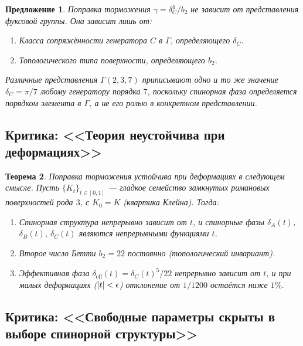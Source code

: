 \documentclass[12pt,a4paper]{article}
\newtheorem{theorem}{Теорема}[section]
\newtheorem{proposition}[theorem]{Предложение}
\theoremstyle{definition}
\theoremstyle{remark}
\DeclarePairedDelimiter\abs{\lvert}{\rvert}
\begin{document}
\begin{proposition}
Поправка торможения $\gamma = \delta_C^4/b_2$ не зависит от представления фуксовой группы. Она зависит лишь от:
\begin{enumerate}[label=(\roman*)]
\item Класса сопряжённости генератора $C$ в $\Gamma$, определяющего $\delta_C$.
\item Топологического типа поверхности, определяющего $b_2$.
\end{enumerate}
Различные представления $\Gamma(2,3,7)$ приписывают одно и то же значение $\delta_C = \pi/7$ любому генератору порядка $7$, поскольку спинорная фаза определяется порядком элемента в $\Gamma$, а не его ролью в конкретном представлении.
\end{proposition}

\subsection{Критика: <<Теория неустойчива при деформациях>>}

\begin{theorem}
\label{thm:stability-ru}
Поправка торможения устойчива при деформациях в следующем смысле. Пусть $\{K_t\}_{t \in [0,1]}$ --- гладкое семейство замкнутых римановых поверхностей рода $3$, с $K_0 = K$ (квартика Клейна). Тогда:
\begin{enumerate}[label=(\roman*)]
\item Спинорная структура непрерывно зависит от $t$, и спинорные фазы $\delta_A(t)$, $\delta_B(t)$, $\delta_C(t)$ являются непрерывными функциями $t$.
\item Второе число Бетти $b_2 = 22$ постоянно (топологический инвариант).
\item Эффективная фаза $\delta_{\mathrm{eff}}(t) = \delta_C(t)^5/22$ непрерывно зависит от $t$, и при малых деформациях ($\abs{t} < \epsilon$) отклонение от $1/1200$ остаётся ниже $1\%$.
\end{enumerate}
\end{theorem}

\subsection{Критика: <<Свободные параметры скрыты в выборе спинорной структуры>>}
\end{document}
